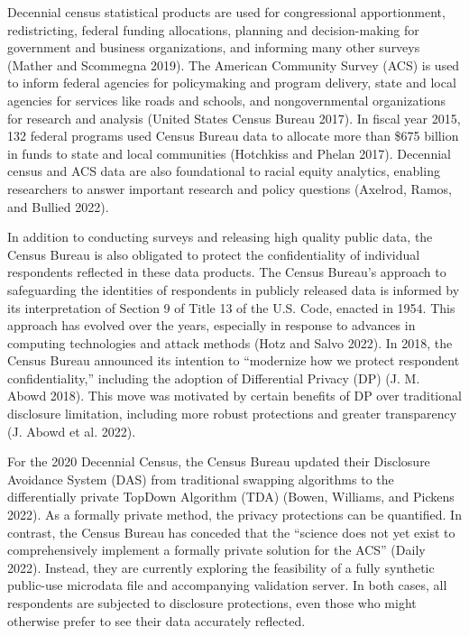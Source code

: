 \documentclass[
]{urban-formatting}
\begin{document}
Decennial census statistical products are used for congressional
apportionment, redistricting, federal funding allocations, planning and
decision-making for government and business organizations, and informing
many other surveys (Mather and Scommegna 2019). The American Community
Survey (ACS) is used to inform federal agencies for policymaking and
program delivery, state and local agencies for services like roads and
schools, and nongovernmental organizations for research and analysis
(United States Census Bureau 2017). In fiscal year 2015, 132 federal
programs used Census Bureau data to allocate more than \$675 billion in
funds to state and local communities (Hotchkiss and Phelan 2017).
Decennial census and ACS data are also foundational to racial equity
analytics, enabling researchers to answer important research and policy
questions (Axelrod, Ramos, and Bullied 2022).

In addition to conducting surveys and releasing high quality public
data, the Census Bureau is also obligated to protect the confidentiality
of individual respondents reflected in these data products. The Census
Bureau's approach to safeguarding the identities of respondents in
publicly released data is informed by its interpretation of Section 9 of
Title 13 of the U.S. Code, enacted in 1954. This approach has evolved
over the years, especially in response to advances in computing
technologies and attack methods (Hotz and Salvo 2022). In 2018, the
Census Bureau announced its intention to ``modernize how we protect
respondent confidentiality,'' including the adoption of Differential
Privacy (DP) (J. M. Abowd 2018). This move was motivated by certain
benefits of DP over traditional disclosure limitation, including more
robust protections and greater transparency (J. Abowd et al. 2022).

For the 2020 Decennial Census, the Census Bureau updated their
Disclosure Avoidance System (DAS) from traditional swapping algorithms
to the differentially private TopDown Algorithm (TDA) (Bowen, Williams,
and Pickens 2022). As a formally private method, the privacy protections
can be quantified. In contrast, the Census Bureau has conceded that the
``science does not yet exist to comprehensively implement a formally
private solution for the ACS'' (Daily 2022). Instead, they are currently
exploring the feasibility of a fully synthetic public-use microdata file
and accompanying validation server. In both cases, all respondents are
subjected to disclosure protections, even those who might otherwise
prefer to see their data accurately reflected.
\end{document}
